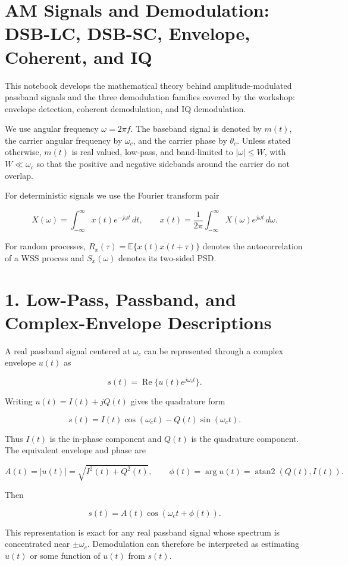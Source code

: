\documentclass[11pt]{article}
\begin{document}
\section*{AM Signals and Demodulation: DSB-LC, DSB-SC, Envelope, Coherent, and IQ}

This notebook develops the mathematical theory behind amplitude-modulated passband signals and the three demodulation families covered by the workshop: envelope detection, coherent demodulation, and IQ demodulation.

We use angular frequency $\omega = 2\pi f$. The baseband signal is denoted by $m(t)$, the carrier angular frequency by $\omega_c$, and the carrier phase by $\theta_c$. Unless stated otherwise, $m(t)$ is real valued, low-pass, and band-limited to $|\omega| \leq W$, with $W \ll \omega_c$ so that the positive and negative sidebands around the carrier do not overlap.

For deterministic signals we use the Fourier transform pair

\[
X(\omega)=\int_{-\infty}^{\infty}x(t)e^{-j\omega t}\,dt,
\qquad
x(t)=\frac{1}{2\pi}\int_{-\infty}^{\infty}X(\omega)e^{j\omega t}\,d\omega.
\]

For random processes, $R_x(\tau)=\mathbb{E}\{x(t)x(t+\tau)\}$ denotes the autocorrelation of a WSS process and $S_x(\omega)$ denotes its two-sided PSD.

\section{1. Low-Pass, Passband, and Complex-Envelope Descriptions}

A real passband signal centered at $\omega_c$ can be represented through a complex envelope $u(t)$ as

\[
s(t)=\operatorname{Re}\{u(t)e^{j\omega_c t}\}.
\]

Writing $u(t)=I(t)+jQ(t)$ gives the quadrature form

\[
s(t)=I(t)\cos(\omega_c t)-Q(t)\sin(\omega_c t).
\]

Thus $I(t)$ is the in-phase component and $Q(t)$ is the quadrature component. The equivalent envelope and phase are

\[
A(t)=|u(t)|=\sqrt{I^2(t)+Q^2(t)},
\qquad
\phi(t)=\arg u(t)=\operatorname{atan2}(Q(t),I(t)).
\]

Then

\[
s(t)=A(t)\cos(\omega_c t+\phi(t)).
\]

This representation is exact for any real passband signal whose spectrum is concentrated near $\pm\omega_c$. Demodulation can therefore be interpreted as estimating $u(t)$ or some function of $u(t)$ from $s(t)$.
\end{document}

